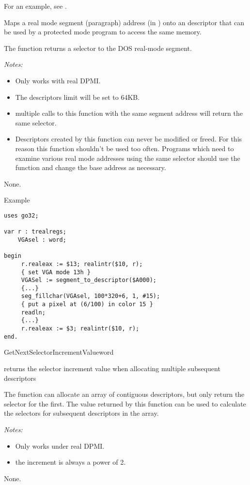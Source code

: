 For an example, see .

{ Maps a real mode segment (paragraph) address 
(in ) onto an descriptor that can be used by a protected mode 
program to access  the same memory.

The function returns a selector to the DOS real-mode segment.

{\em Notes:}
\begin{itemize}
\item Only works with real DPMI.
\item The descriptors limit will be set to 64KB.
\item multiple calls to this function with the same segment address will
  return the same selector.
\item Descriptors created by this function can never be modified or freed.
For this reason this function shouldn't be used too often. Programs
which need to examine various real mode addresses using the same
selector should use the function  and change
the base address as necessary.
\end{itemize}
}
{None.}
{}
\begin{FPCList}
\item[Example]
\begin{verbatim}
uses go32;

var r : trealregs;
    VGAsel : word;

begin
     r.realeax := $13; realintr($10, r); 
     { set VGA mode 13h }
     VGASel := segment_to_descriptor($A000);
     {...}
     seg_fillchar(VGAsel, 100*320+6, 1, #15); 
     { put a pixel at (6/100) in color 15 }
     readln;
     {...} 
     r.realeax := $3; realintr($10, r);
end.
\end{verbatim}
\end{FPCList}


{GetNextSelectorIncrementValue}{word}
{ returns the selector increment 
value when allocating multiple subsequent descriptors

The function  can allocate an array of
contiguous descriptors, but only return the selector for the first. The
value returned by this function can be used to calculate the selectors
for subsequent descriptors in the array.

{\em Notes:}
\begin{itemize}
\item Only works under real DPMI.
\item the increment is always a power of 2.
\end{itemize}
}
{None.}
{}

